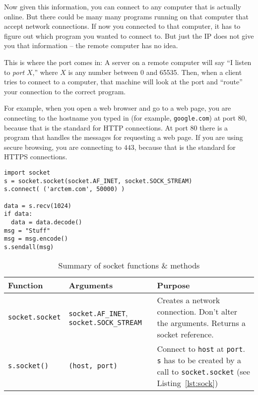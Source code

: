 \documentclass[11pt]{cselabheader}
\begin{document}
Now given this information, you can connect to any computer that is actually
online. But there could be many many programs running on that computer that
accept network connections. If now you connected to that computer, it has to
figure out which program you wanted to connect to. But just the IP does not give
you that information -- the remote computer has no idea.

This is where the port comes in: A server on a remote computer will say ``I
listen to \emph{port} $X$,'' where $X$ is any number between 0 and 65535. Then,
when a client tries to connect to a computer, that machine will look at the port
and ``route'' your connection to the correct program.

For example, when you open a web browser and go to a web page, you are
connecting to the hostname you typed in (for example, \texttt{google.com}) at
port $80$, because that is the standard for HTTP connections. At port $80$ there
is a program that handles the messages for requesting a web page. If you are
using secure browsing, you are connecting to $443$, because that is the standard
for HTTPS connections.

\begin{lstlisting}[style=python,label={lst:sock},caption={Code that shows usage, but does not
actually make sense}]
import socket
s = socket.socket(socket.AF_INET, socket.SOCK_STREAM)
s.connect( ('arctem.com', 50000) )

data = s.recv(1024)
if data:
  data = data.decode()
msg = "Stuff"
msg = msg.encode()
s.sendall(msg)
\end{lstlisting}

\begin{table}[!ht]
  \centering
  \begin{tabular}{p{2.5cm} p{3.3cm} p{10cm}}
    \toprule
    \bfseries Function & \bfseries Arguments & \bfseries Purpose \\
    \midrule
    \lstinline!socket.socket! & \lstinline!socket.AF_INET!, \lstinline!socket.SOCK_STREAM! &
    Creates a network connection. Don't alter the arguments. Returns a socket
    reference.\\
    \lstinline!s.socket()! & \lstinline!(host, port)! & Connect to
    \lstinline!host! at \lstinline!port!. \lstinline!s! has to be created by a
    call to \lstinline!socket.socket! (see Listing~\ref{lst:sock})\\
    \bottomrule
  \end{tabular}
  \caption{Summary of socket functions \& methods}
  \label{tab:sum}
\end{table}
\end{document}
